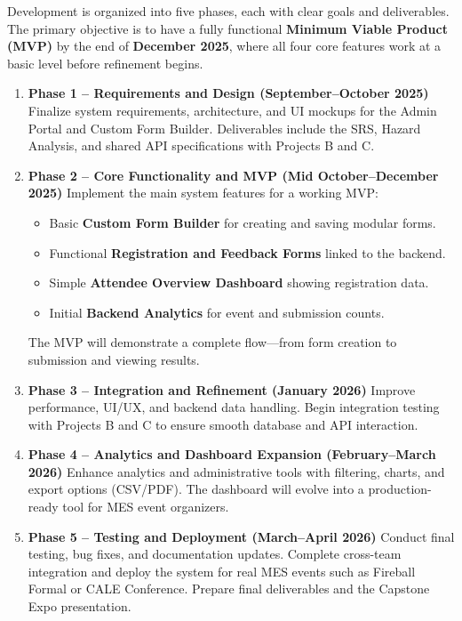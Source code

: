 \documentclass[12pt]{article}
\begin{document}
Development is organized into five phases, each with clear goals and deliverables.  
The primary objective is to have a fully functional \textbf{Minimum Viable Product (MVP)} by the end of \textbf{December 2025}, where all four core features work at a basic level before refinement begins.

\begin{enumerate}
    \item \textbf{Phase 1 – Requirements and Design (September–October 2025)}  
    Finalize system requirements, architecture, and UI mockups for the Admin Portal and Custom Form Builder.  
    Deliverables include the SRS, Hazard Analysis, and shared API specifications with Projects B and C.
    
    \item \textbf{Phase 2 – Core Functionality and MVP (Mid October–December 2025)}  
    Implement the main system features for a working MVP:
    \begin{itemize}
        \item Basic \textbf{Custom Form Builder} for creating and saving modular forms.  
        \item Functional \textbf{Registration and Feedback Forms} linked to the backend.  
        \item Simple \textbf{Attendee Overview Dashboard} showing registration data.  
        \item Initial \textbf{Backend Analytics} for event and submission counts.
    \end{itemize}
    The MVP will demonstrate a complete flow—from form creation to submission and viewing results.
    
    \item \textbf{Phase 3 – Integration and Refinement (January 2026)}  
    Improve performance, UI/UX, and backend data handling.  
    Begin integration testing with Projects B and C to ensure smooth database and API interaction.
    
    \item \textbf{Phase 4 – Analytics and Dashboard Expansion (February–March 2026)}  
    Enhance analytics and administrative tools with filtering, charts, and export options (CSV/PDF).  
    The dashboard will evolve into a production-ready tool for MES event organizers.
    
    \item \textbf{Phase 5 – Testing and Deployment (March–April 2026)}  
    Conduct final testing, bug fixes, and documentation updates.  
    Complete cross-team integration and deploy the system for real MES events such as Fireball Formal or CALE Conference.  
    Prepare final deliverables and the Capstone Expo presentation.
\end{enumerate}
\end{document}
